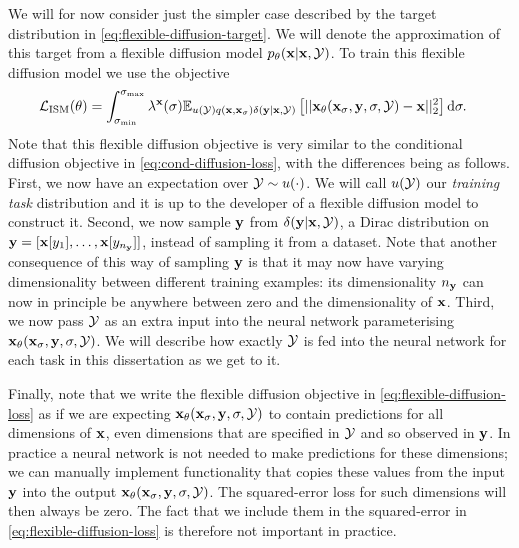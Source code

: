 We will for now consider just the simpler case described by the target distribution in \cref{eq:flexible-diffusion-target}. We will denote the approximation of this target from a flexible diffusion model $p_\theta({\mathbf{x}}|{\mathbf{x}},{\mathcal{Y}})$. To train this flexible diffusion model we use the objective
\begin{align} \label{eq:flexible-diffusion-loss}
    \mathcal{L}_\text{ISM}(\theta) &= \int_{\sigma_\text{min}}^{\sigma_\text{max}} \lambda^{\mathbf{x}}(\sigma) \mathbb{E}_{u({\mathcal{Y}})q({\mathbf{x}}, {\mathbf{x}}_\sigma)\delta({\mathbf{y}}|{\mathbf{x}},{\mathcal{Y}})} \left[ 
    || {\mathbf{x}}_\theta({\mathbf{x}}_\sigma, {\mathbf{y}}, \sigma, {\mathcal{Y}}) - {\mathbf{x}} ||_2^2 \right] \mathrm{d}\sigma.
\end{align}
Note that this flexible diffusion objective is very similar to the conditional diffusion objective in \cref{eq:cond-diffusion-loss}, with the differences being as follows. First, we now have an expectation over ${\mathcal{Y}} \sim u(\cdot)$. We will call $u({\mathcal{Y}})$ our \textit{training task} distribution and it is up to the developer of a flexible diffusion model to construct it. Second, we now sample ${\mathbf{y}}$ from $\delta({\mathbf{y}}|{\mathbf{x}},{\mathcal{Y}})$, a Dirac distribution on ${\mathbf{y}} = [ {\mathbf{x}}[y_1], \ldots, {\mathbf{x}}[y_{n_{\mathbf{y}}}] ]$, instead of sampling it from a dataset. Note that another consequence of this way of sampling ${\mathbf{y}}$ is that it may now have varying dimensionality between different training examples: its dimensionality $n_{\mathbf{y}}$ can now in principle be anywhere between zero and the dimensionality of ${\mathbf{x}}$. Third, we now pass ${\mathcal{Y}}$ as an extra input into the neural network parameterising ${\mathbf{x}}_\theta({\mathbf{x}}_\sigma, {\mathbf{y}}, \sigma, {\mathcal{Y}})$. We will describe how exactly ${\mathcal{Y}}$ is fed into the neural network for each task in this dissertation as we get to it.

Finally, note that we write the flexible diffusion objective in  \cref{eq:flexible-diffusion-loss} as if we are expecting ${\mathbf{x}}_\theta({\mathbf{x}}_\sigma, {\mathbf{y}}, \sigma, {\mathcal{Y}})$ to contain predictions for all dimensions of ${\mathbf{x}}$, even dimensions that are specified in ${\mathcal{Y}}$ and so observed in ${\mathbf{y}}$. In practice a neural network is not needed to make predictions for these dimensions; we can manually implement functionality that copies these values from the input ${\mathbf{y}}$ into the output ${\mathbf{x}}_\theta({\mathbf{x}}_\sigma, {\mathbf{y}}, \sigma, {\mathcal{Y}})$. The squared-error loss for such dimensions will then always be zero. The fact that we include them in the squared-error in \cref{eq:flexible-diffusion-loss} is therefore not important in practice.

